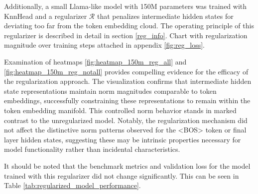Additionally, a small Llama-like model with 150M parameters was trained with KnnHead and a regularizer $\mathcal{R}$ that penalizes intermediate hidden states for deviating too far from the token embedding cloud. The operating principle of this regularizer is described in detail in section \ref{reg_info}. Chart with regularization magnitude over training steps attached in appendix \ref{fig:reg_loss}.


Examination of heatmaps \ref{fig:heatmap_150m_reg_all} and \ref{fig:heatmap_150m_reg_notall} provides compelling evidence for the efficacy of the regularization approach. The visualization confirms that intermediate hidden state representations maintain norm magnitudes comparable to token embeddings, successfully constraining these representations to remain within the token embedding manifold. This controlled norm behavior stands in marked contrast to the unregularized model. Notably, the regularization mechanism did not affect the distinctive norm patterns observed for the <BOS> token or final layer hidden states, suggesting these may be intrinsic properties necessary for model functionality rather than incidental characteristics.

It should be noted that the benchmark metrics and validation loss for the model trained with this regularizer did not change significantly. This can be seen in Table \ref{tab:regularized_model_performance}.
